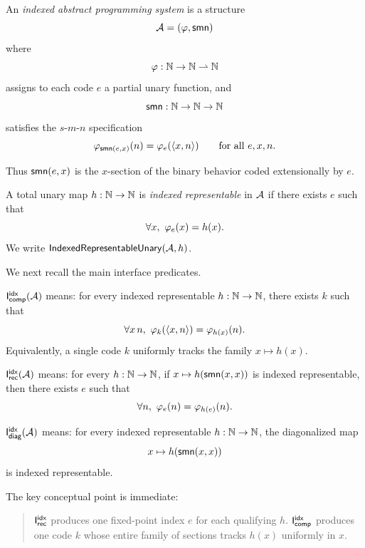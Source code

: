 \documentclass[11pt]{article}
\begin{document}
\begin{definition}
An \emph{indexed abstract programming system} is a structure
\[
\mathcal{A} = (\varphi,\mathsf{smn})
\]
where
\[
\varphi : \mathbb{N} \to \mathbb{N} \rightharpoonup \mathbb{N}
\]
assigns to each code \(e\) a partial unary function, and
\[
\mathsf{smn} : \mathbb{N} \to \mathbb{N} \to \mathbb{N}
\]
satisfies the \(s\)-\(m\)-\(n\) specification
\[
\varphi_{\mathsf{smn}(e,x)}(n)=\varphi_e(\langle x,n\rangle)
\qquad\text{for all }e,x,n.
\]
\end{definition}

Thus \(\mathsf{smn}(e,x)\) is the \(x\)-section of the binary behavior coded extensionally by \(e\).

\begin{definition}
A total unary map \(h:\mathbb{N}\to\mathbb{N}\) is \emph{indexed representable} in \(\mathcal{A}\) if there exists \(e\) such that
\[
\forall x,\ \phiaps_e(x)=h(x).
\]
We write \(\mathsf{IndexedRepresentableUnary}(\mathcal{A},h)\).
\end{definition}

We next recall the main interface predicates.

\begin{definition}
\(\mathsf{I}_{\mathsf{comp}}^{\mathsf{idx}}(\mathcal{A})\) means:
for every indexed representable \(h:\mathbb{N}\to\mathbb{N}\), there exists \(k\) such that
\[
\forall x\,n,\ \varphi_k(\langle x,n\rangle)=\varphi_{h(x)}(n).
\]
Equivalently, a single code \(k\) uniformly tracks the family \(x \mapsto h(x)\).
\end{definition}

\begin{definition}
\(\mathsf{I}_{\mathsf{rec}}^{\mathsf{idx}}(\mathcal{A})\) means:
for every \(h:\mathbb{N}\to\mathbb{N}\), if \(x\mapsto h(\mathsf{smn}(x,x))\) is indexed representable, then there exists \(e\) such that
\[
\forall n,\ \phiaps_e(n)=\phiaps_{h(e)}(n).
\]
\end{definition}

\begin{definition}
\(\mathsf{I}_{\mathsf{diag}}^{\mathsf{idx}}(\mathcal{A})\) means:
for every indexed representable \(h:\mathbb{N}\to\mathbb{N}\), the diagonalized map
\[
x \mapsto h(\mathsf{smn}(x,x))
\]
is indexed representable.
\end{definition}

The key conceptual point is immediate:

\begin{quote}
\(\mathsf{I}_{\mathsf{rec}}^{\mathsf{idx}}\) produces one fixed-point index \(e\) for each qualifying \(h\).  
\(\mathsf{I}_{\mathsf{comp}}^{\mathsf{idx}}\) produces one code \(k\) whose entire family of sections tracks \(h(x)\) uniformly in \(x\).
\end{quote}
\end{document}

